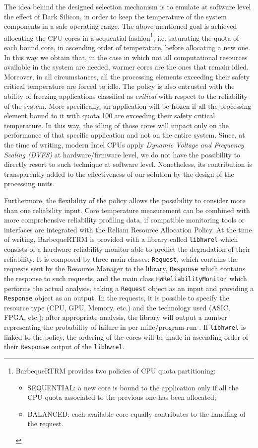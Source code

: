 The idea behind the designed selection mechanism is to emulate at software level the effect of Dark Silicon, in order to keep the temperature of the system components in a safe operating range. The above mentioned goal is achieved allocating the CPU cores in a sequential fashion\cprotect\footnote{BarbequeRTRM provides two policies of CPU quota partitioning:
\begin{itemize}
    \item SEQUENTIAL: a new core is bound to the application only if all the CPU quota associated to the previous one has been allocated;
    \item BALANCED: each available core equally contributes to the handling of the request.
\end{itemize}}, i.e. saturating the quota of each bound core, in ascending order of temperature, before allocating a new one. In this way we obtain that, in the case in which not all computational resources available in the system are needed, warmer cores are the ones that remain idled. Moreover, in all circumstances, all the processing elements exceeding their safety critical temperature are forced to idle. The policy is also entrusted with the ability of freezing applications classified as \emph{critical} with respect to the reliability of the system. More specifically, an application will be frozen if all the processing element bound to it with quota 100 are exceeding their safety critical temperature. In this way, the idling of those cores will impact only on the performance of that specific application and not on the entire system. Since, at the time of writing, modern Intel CPUs apply \emph{Dynamic Voltage and Frequency Scaling (DVFS)} at hardware/firmware level, we do not have the possibility to directly resort to such technique at software level. Nonetheless, its contribution is transparently added to the effectiveness of our solution by the design of the processing units.

Furthermore, the flexibility of the policy allows the possibility to consider more than one reliability input. Core temperature measurement can be combined with more comprehensive reliability profiling data, if compatible monitoring tools or interfaces are integrated with the Reliam Resource Allocation Policy. At the time of writing, BarbequeRTRM is provided with a library called \verb|libhwrel| \cite{recipedel} which consists of a hardware reliability monitor able to predict the degradation of their reliability. It is composed by three main classes: \verb|Request|, which contains the requests sent by the Resource Manager to the library, \verb|Response| which contains the response to such requests, and the main class \verb|HWReliabilityMonitor| which performs the actual analysis, taking a \verb|Request| object as an input and providing a \verb|Response| object as an output. In the requests, it is possible to specify the resource type (CPU, GPU, Memory, etc.) and the technology used (ASIC, FPGA, etc.): after appropriate analysis, the library will output a number representing the probability of failure in per-mille/program-run \cite{recipedel}. If \verb|libhwrel| is linked to the policy, the ordering of the cores will be made in ascending order of their \verb|Response| output of the \verb|libhwrel|.

